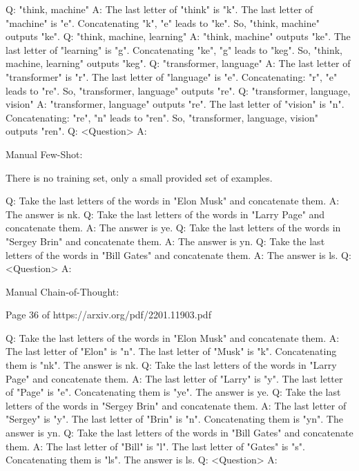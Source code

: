 \documentclass[11pt]{article}
\begin{document}
Q: "think, machine"
A: The last letter of "think" is "k". The last letter of "machine" is "e". Concatenating "k", "e" leads to
"ke". So, "think, machine" outputs "ke".
Q: "think, machine, learning"
A: "think, machine" outputs "ke". The last letter of "learning" is "g". Concatenating "ke", "g" leads to
"keg". So, "think, machine, learning" outputs "keg".
Q: "transformer, language"
A: The last letter of "transformer" is "r". The last letter of "language" is "e". Concatenating: "r", "e"
leads to "re". So, "transformer, language" outputs "re".
Q: "transformer, language, vision"
A: "transformer, language" outputs "re". The last letter of "vision" is "n". Concatenating: "re", "n" leads
to "ren". So, "transformer, language, vision" outputs "ren".
Q: <Question>
A: 

Manual Few-Shot:

There is no training set, only a small provided set of examples.

Q: Take the last letters of the words in "Elon Musk" and concatenate them.
A: The answer is nk.
Q: Take the last letters of the words in "Larry Page" and concatenate them.
A: The answer is ye.
Q: Take the last letters of the words in "Sergey Brin" and concatenate them.
A: The answer is yn.
Q: Take the last letters of the words in "Bill Gates" and concatenate them.
A: The answer is ls.
Q: <Question>
A: 

Manual Chain-of-Thought:

Page 36 of https://arxiv.org/pdf/2201.11903.pdf

Q: Take the last letters of the words in "Elon Musk" and concatenate them.
A: The last letter of "Elon" is "n". The last letter of "Musk" is "k". Concatenating them is "nk". The answer is nk.
Q: Take the last letters of the words in "Larry Page" and concatenate them.
A: The last letter of "Larry" is "y". The last letter of "Page" is "e". Concatenating them is "ye". The answer is ye.
Q: Take the last letters of the words in "Sergey Brin" and concatenate them.
A: The last letter of "Sergey" is "y". The last letter of "Brin" is "n". Concatenating them is "yn". The answer is yn.
Q: Take the last letters of the words in "Bill Gates" and concatenate them.
A: The last letter of "Bill" is "l". The last letter of "Gates" is "s". Concatenating them is "ls". The answer is ls.
Q: <Question>
A: 
\end{document}
